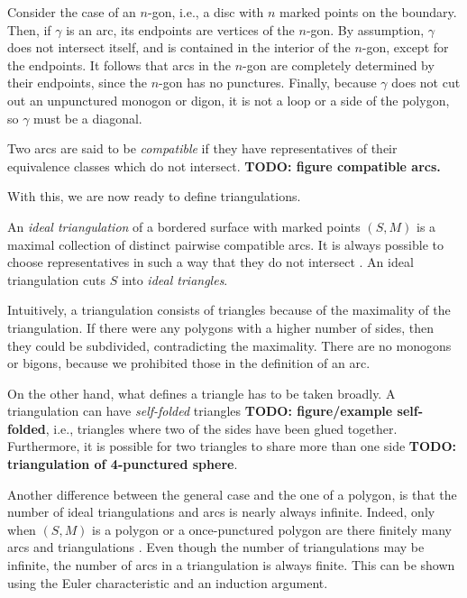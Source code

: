 Consider the case of an $n$-gon, i.e., a disc with $n$ marked points on the boundary.
Then, if $\gamma$ is an arc, its endpoints are vertices of the $n$-gon. By assumption,
$\gamma$ does not intersect itself, and is contained in the interior of the $n$-gon,
except for the endpoints. It follows that arcs in the $n$-gon are completely determined
by their endpoints, since the $n$-gon has no punctures. Finally, because $\gamma$ does
not cut out an unpunctured monogon or digon, it is not a loop or a side of the polygon,
so $\gamma$ must be a diagonal.

\begin{definition}

	Two arcs are said to be \emph{compatible} if they have
	representatives of their equivalence classes which do not intersect. \textbf{TODO:
		figure compatible arcs. }
\end{definition}

With this, we are now ready to define triangulations.

\begin{definition}

	An \emph{ideal triangulation} of a bordered surface with
	marked points $(S, M)$ is a maximal collection of distinct pairwise compatible arcs. It
	is always possible to choose representatives in such a way that they do not intersect \parencite[Proposition 2.5]{FominShapiroThurston2008CATriangulatedSurfacesI}. An ideal
	triangulation cuts $S$ into \emph{ideal triangles}.
\end{definition}

Intuitively, a triangulation consists of triangles because of the maximality of the
triangulation. If there were any polygons with a higher number of sides, then they
could be subdivided, contradicting the maximality. There are no monogons or bigons,
because we prohibited those in the definition of an arc.

On the other hand, what defines a triangle has to be taken broadly. A triangulation can
have \emph{self-folded} triangles \textbf{TODO:
	figure/example self-folded}, i.e., triangles where two of the sides have been glued
together. Furthermore, it is possible for two triangles to share more than one side
\textbf{TODO: triangulation of 4-punctured sphere}.

Another difference between the general case and the one of a polygon, is that the
number of ideal triangulations and arcs is nearly always infinite. Indeed, only when
$(S, M)$ is a polygon or a once-punctured polygon are there finitely many arcs and
triangulations \parencite[Proposition 2.3]{FominShapiroThurston2008CATriangulatedSurfacesI}. Even though
the number of triangulations may be infinite, the number of arcs in a triangulation is
always finite. This can be shown using the Euler characteristic and an induction
argument.

